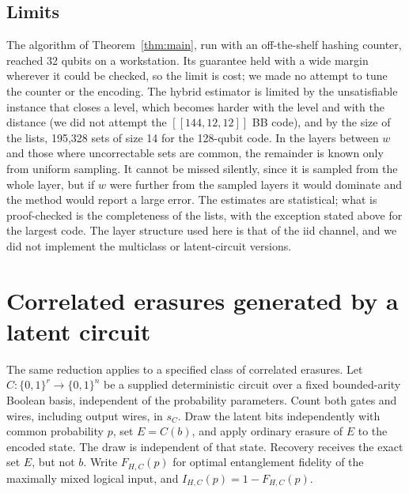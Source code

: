 \documentclass[11pt]{article}
\theoremstyle{remark}
\begin{document}
\subsection{Limits}
\label{sec:computed-limits}

The algorithm of Theorem~\ref{thm:main}, run with an off-the-shelf
hashing counter, reached 32 qubits on a workstation. Its guarantee held
with a wide margin wherever it could be checked, so the limit is cost;
we made no attempt to tune the counter or the encoding. The hybrid
estimator is limited by the unsatisfiable instance that closes a level,
which becomes harder with the level and with the distance (we did not
attempt the \([[144,12,12]]\) BB code), and by the size of the lists,
195{,}328 sets of size 14 for the 128-qubit code. In the layers between
\(w\) and those where uncorrectable sets are common, the remainder is
known only from uniform sampling. It cannot be missed silently, since it
is sampled from the whole layer, but if \(w\) were further from the
sampled layers it would dominate and the method would report a large
error. The estimates are statistical; what is proof-checked is the
completeness of the lists, with the exception stated above for the
largest code. The layer structure used here is that of the iid channel,
and we did not implement the multiclass or latent-circuit versions.

\section{Correlated erasures generated by a latent circuit}
\label{sec:latent}

The same reduction applies to a specified class of correlated erasures.
Let \(C:\{0,1\}^r\to\{0,1\}^n\) be a supplied deterministic circuit
over a fixed bounded-arity Boolean basis, independent of the probability
parameters. Count both gates and wires, including output wires, in \(s_C\).
Draw the latent bits independently with common probability \(p\), set
\(E=C(b)\), and apply ordinary erasure of \(E\) to the encoded state.
The draw is independent of that state. Recovery receives the exact set
\(E\), but not \(b\). Write \(F_{H,C}(p)\) for optimal
entanglement fidelity of the maximally mixed logical input, and
\(I_{H,C}(p)=1-F_{H,C}(p)\).
\end{document}
